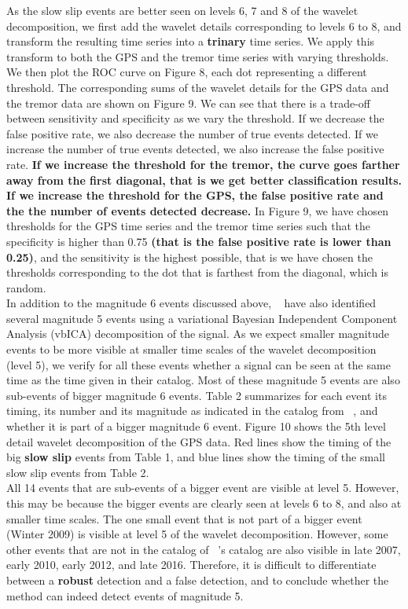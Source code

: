 \documentclass{article}
\begin{document}
As the slow slip events are better seen on levels 6, 7 and 8 of the wavelet decomposition, we first add the wavelet details corresponding to levels 6 to 8, and transform the resulting time series into a \textbf{trinary} time series. We apply this transform to both the GPS and the tremor time series with varying thresholds. We then plot the ROC curve on Figure 8, each dot representing a different threshold. The corresponding sums of the wavelet details for the GPS data and the tremor data are shown on Figure 9. We can see that there is a trade-off between sensitivity and specificity as we vary the threshold. If we decrease the false positive rate, we also decrease the number of true events detected. If we increase the number of true events detected, we also increase the false positive rate. \textbf{If we increase the threshold for the tremor, the curve goes farther away from the first diagonal, that is we get better classification results. If we increase the threshold for the GPS, the false positive rate and the the number of events detected decrease.} In Figure 9, we have chosen thresholds for the GPS time series and the tremor time series such that the specificity is higher than 0.75 \textbf{(that is the false positive rate is lower than 0.25)}, and the sensitivity is the highest possible, that is we have chosen the thresholds corresponding to the dot that is farthest from the diagonal, which is random. \\

In addition to the magnitude 6 events discussed above,  ~\citet{MIC_2019} have also identified several magnitude 5 events using a variational Bayesian Independent Component Analysis (vbICA) decomposition of the signal. As we expect smaller magnitude events to be more visible at smaller time scales of the wavelet decomposition (level 5), we verify for all these events whether a signal can be seen at the same time as the time given in their catalog. Most of these magnitude 5 events are also sub-events of bigger magnitude 6 events. Table 2 summarizes for each event its timing, its number and its magnitude as indicated in the catalog from ~\citet{MIC_2019}, and whether it is part of a bigger magnitude 6 event. Figure 10 shows the 5th level detail wavelet decomposition of the GPS data. Red lines show the timing of the big \textbf{slow slip} events from Table 1, and blue lines show the timing of the small slow slip events from Table 2. \\

All 14 events that are sub-events of a bigger event are visible at level 5. However, this may be because the bigger events are clearly seen at levels 6 to 8, and also at smaller time scales. The one small event that is not part of a bigger event (Winter 2009) is visible at level 5 of the wavelet decomposition. However, some other events that are not in the catalog of ~\citet{MIC_2019}'s catalog are also visible in late 2007, early 2010, early 2012, and late 2016. Therefore, it is difficult to differentiate between a \textbf{robust} detection and a false detection, and to conclude whether the method can indeed detect events of magnitude 5. \\
\end{document}
